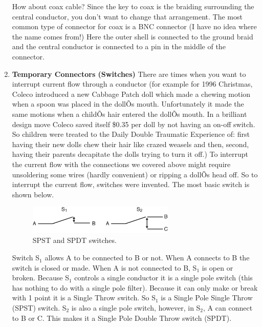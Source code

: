 \documentclass[12pt]{article}
\begin{document}
\begin{enumerate}[1.]
\par How about coax cable? 
Since the key to coax is the braiding surrounding the central conductor, you don't want to change that arrangement. 
The most common type of connector for coax is a BNC connector (I have no idea where the name comes from!) 
Here the outer shell is connected to the ground braid and the central conductor is connected to a pin in the middle of the connector.

\item{\bf Temporary Connectors (Switches)}
There are times when you want to interrupt current flow through a conductor (for example for 1996 Christmas, Coleco introduced a new Cabbage Patch doll which made a chewing motion when a spoon was placed in the dollÕs mouth. Unfortunately it made the same motions when a childÕs hair entered the dollÕs mouth. In a brilliant design move Coleco saved itself
\$0.35 per doll by not having an on-off switch. So
children were treated to the Daily Double Traumatic
Experience of: first having their new dolls chew their
hair like crazed weasels and then, second, having their
parents decapitate the dolls trying to turn it off.) To
interrupt the current flow with the connections we
covered above might require unsoldering some wires
(hardly convenient) or ripping a dollÕs head off. So
to interrupt the current flow, switches were invented.
The most basic switch is shown below.

\begin{figure}[!ht]
\begin{center}
\includegraphics[width=0.66\textwidth,trim=0 0 0 0,clip=false]{lab2fig4.png}
\caption*{SPST and SPDT switches.}
\end{center}
\end{figure}

\par Switch S$_1$ allows A to be connected to B or not. 
When A connects to B the switch is closed or made. When A is not connected to B, S$_1$ is open or broken. 
Because S$_1$ controls a single conductor it is a single pole switch (this has nothing to do with a single pole filter). 
Because it can only make or break with 1 point it is a Single Throw switch. 
So S$_1$ is a Single Pole Single Throw (SPST) switch. 
S$_2$ is also a single pole switch, however, in S$_2$, A can connect to B or C. 
This makes it a Single Pole Double Throw switch (SPDT).


\end{enumerate}
\end{document}
